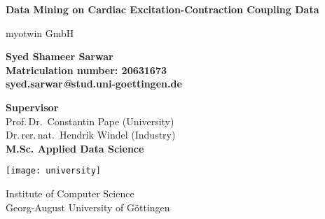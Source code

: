 \begin{titlepage}
    \begin{center}
        \vspace*{1cm}
            
        \Huge
        \textbf{Data Mining on Cardiac Excitation-Contraction Coupling Data}
            
        \vspace{0.5cm}
        \LARGE
        myotwin GmbH
            
        \vspace{0.8cm}
            
        \textbf{Syed Shameer Sarwar} \\
        \vspace{0.2cm}
        \large
        \textbf{Matriculation number: 20631673}\\
        \textbf{syed.sarwar\textsl{\textbf{@}}stud.uni-goettingen.de}


        \vspace{0.8cm}
        \textbf{Supervisor}\\
        Prof.\,Dr.~Constantin Pape (University) \\
        Dr.\,rer.\,nat.~Hendrik Windel (Industry) \\
        
            
        \vfill
        \vspace{0.4cm}
        \textbf{M.Sc. Applied Data Science}
            
        \vspace{0.8cm}
            
        \texttt{[image: university]}
        
        \Large
        \vspace{0.4cm}
        Institute of Computer Science\\
        Georg-August University of Göttingen\\
        \mysubmissiondate
            
    \end{center}
\end{titlepage}
